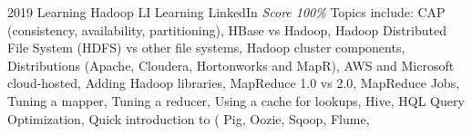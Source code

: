 \documentclass[11pt,a4paper]{moderncv}
\begin{document}
\cventry
    {2019}
    {Learning Hadoop}
    {LI Learning}
    {LinkedIn}
    {\textit{Score 100\%}}
    {
        Topics include:                                                                                           %
            CAP (consistency, availability, partitioning),                                                        %
            HBase vs Hadoop,                                                                                      %
            Hadoop Distributed File System (HDFS) vs other file systems,                                          %
            Hadoop cluster components,                                                                            %
            Distributions (Apache, Cloudera, Hortonworks and MapR),                                               %
            AWS and Microsoft cloud-hosted,                                                                       %
            Adding Hadoop libraries,                                                                              %
            MapReduce 1.0 vs 2.0,                                                                                 %
            MapReduce Jobs,                                                                                       %
            Tuning a mapper,                                                                                      %
            Tuning a reducer,                                                                                     %
            Using a cache for lookups,                                                                            %
            Hive,                                                                                                 %
            HQL Query Optimization,                                                                               %
            Quick introduction to (                                                                               %
                Pig,                                                                                              %
                Oozie,                                                                                            %
                Sqoop,                                                                                            %
                Flume,                                                                                            %
}
\end{document}
